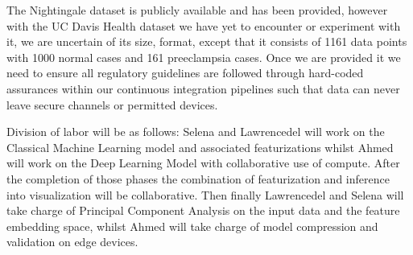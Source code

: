 \documentclass[sigconf,nonacm]{acmart}
\begin{document}
The Nightingale dataset is publicly available and has been provided, however with the UC Davis Health dataset we have yet to encounter or experiment with it, we are uncertain of its size, format, except that it consists  of 1161 data points with 1000 normal cases and 161 preeclampsia cases. Once we are provided it we need to ensure all regulatory guidelines are followed through hard-coded assurances within our continuous integration pipelines such that data can never leave secure channels or permitted devices.

Division of labor will be as follows: Selena and Lawrencedel will work on the Classical Machine Learning model and associated featurizations whilst Ahmed will work on the Deep Learning Model with collaborative use of compute. After the completion of those phases the combination of featurization and inference into visualization will be collaborative. Then finally Lawrencedel and Selena will take charge of Principal Component Analysis on the input data and the feature embedding space, whilst Ahmed will take charge of model compression and validation on edge devices.




\end{document}
